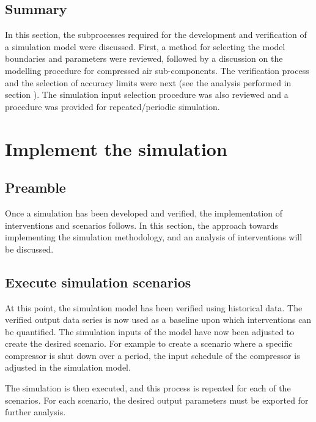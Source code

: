 	\subsection{Summary}	
In this section, the subprocesses required for the development and verification of a simulation model were discussed. First, a method for selecting the model boundaries and parameters were reviewed, followed by a discussion on the modelling procedure for compressed air sub-components. The verification process and the selection of accuracy limits were next (see the analysis performed in section ). The simulation input selection procedure was also reviewed and a procedure was provided for repeated/periodic simulation.

\section{Implement the simulation}
	\subsection{Preamble}
		Once a simulation has been developed and verified, the implementation of interventions and scenarios follows. In this section, the approach towards implementing the simulation methodology, and an analysis of interventions will be discussed.
	\subsection{Execute simulation scenarios}
		At this point, the simulation model has been verified using historical data. The verified output data series is now used as a baseline upon which interventions can be quantified. The simulation inputs of the model have now been adjusted to create the desired scenario. For example to create a scenario where a specific compressor is shut down over a period, the input schedule of the compressor is adjusted in the simulation model.
		\par
		The simulation is then executed, and this process is repeated for each of the scenarios. For each scenario, the desired output parameters must be exported for further analysis.

